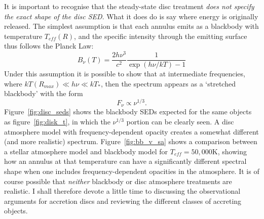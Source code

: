 It is important to recognise that the steady-state disc treatment
{\sl does not specify the exact shape of the disc SED}. What it does do is 
say where energy is originally released. The simplest assumption is
that each annulus emits as a blackbody with temperature 
$T_{eff} (R)$, and the specific intensity through the emitting surface
thus follows the Planck Law:
\begin{equation}
B_\nu (T) = \frac{2 h \nu^3}{c^2} \frac{1}{\exp(h\nu / kT) - 1}
\label{eq:planck}
\end{equation}
Under this assumption it is possible to show that at intermediate frequencies, 
where $kT(R_{max}) \ll h \nu \ll kT_*$,
then the spectrum appears as a `stretched blackbody' with the form 
\begin{equation}
F_{\nu} \propto \nu^{1/3}.
\end{equation}
Figure~\ref{fig:disc_seds} shows the blackbody SEDs expected for the same 
objects as figure~\ref{fig:disk_t}, in
which the $\nu^{1/3}$ portion can be clearly seen.
A disc atmosphere model with frequency-dependent opacity creates a somewhat 
different (and more realistic) spectrum. 
Figure~\ref{fig:bb_v_sa} shows a comparison between a stellar atmosphere model and
blackbody model for $T_{eff}=50,000$K, showing how an annulus at that temperature
can have a significantly different spectral shape when one includes frequency-dependent opacities
in the atmosphere. It is of course possible that {\em neither} blackbody or disc atmosphere
treatments are realistic. I shall therefore devote a little time to discussing
the observational arguments for accretion discs and reviewing
the different classes of accreting objects.


